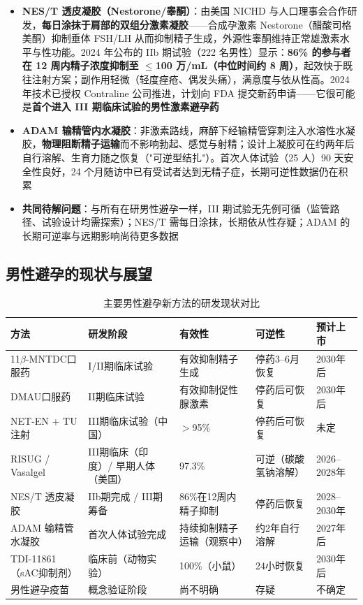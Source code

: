 \begin{itemize}[leftmargin=2cm]
	\item \textbf{NES/T 透皮凝胶（Nestorone/睾酮）}：由美国 NICHD 与人口理事会合作研发，\textbf{每日涂抹于肩部的双组分激素凝胶}——合成孕激素 Nestorone（醋酸司格美酮）抑制垂体 FSH/LH 从而抑制精子生成，外源性睾酮维持正常雄激素水平与性功能。2024 年公布的 IIb 期试验（222 名男性）显示：\textbf{86\% 的参与者在 12 周内精子浓度抑制至 $\leq$100 万/mL（中位时间约 8 周）}，起效快于既往注射方案；副作用轻微（轻度痤疮、偶发头痛），满意度与依从性高。2024 年技术已授权 Contraline 公司推进，计划向 FDA 提交新药申请——它很可能是\textbf{首个进入 III 期临床试验的男性激素避孕药}
	\item \textbf{ADAM 输精管内水凝胶}：非激素路线，麻醉下经输精管穿刺注入水溶性水凝胶，\textbf{物理阻断精子运输}而不影响勃起、感觉与射精；设计上凝胶可在约两年后自行溶解、生育力随之恢复（"可逆型结扎"）。首次人体试验（25 人）90 天安全性良好，24 个月随访中已有受试者达到无精子症，长期可逆性数据仍在积累
	\item \textbf{共同待解问题}：与所有在研男性避孕一样，III 期试验无先例可循（监管路径、试验设计均需探索）；NES/T 需每日涂抹，长期依从性存疑；ADAM 的长期可逆率与远期影响尚待更多数据
\end{itemize}

\subsection{男性避孕的现状与展望}

\begin{table}[htbp]
\centering
\caption{主要男性避孕新方法的研发现状对比}
\label{tab:male_contraception_new}
\begin{tabularx}{\textwidth}{@{}lXXXX@{}}
    \toprule
    \textbf{方法} & \textbf{研发阶段} & \textbf{有效性} & \textbf{可逆性} & \textbf{预计上市} \\
    \midrule
    11$\beta$-MNTDC口服药 & I/II期临床试验 & 有效抑制精子生成 & 停药3--6月恢复 & 2030年后 \\
    DMAU口服药 & II期临床试验 & 有效抑制促性腺激素 & 停药后可恢复 & 2030年后 \\
    NET-EN + TU注射 & III期临床试验（中国） & $>$95\% & 停药后可恢复 & 未定 \\
    RISUG / Vasalgel & III期临床（印度）/ 早期人体（美国） & 97.3\% & 可逆（碳酸氢钠溶解） & 2026--2028年 \\
    NES/T 透皮凝胶 & IIb期完成 / III期筹备 & 86\%在12周内精子抑制 & 停药后恢复 & 2028--2030年 \\
    ADAM 输精管水凝胶 & 首次人体试验完成 & 持续抑制精子运输（观察中） & 约2年自行溶解 & 2027年后 \\
    TDI-11861（sAC抑制剂） & 临床前（动物实验） & 100\%（小鼠） & 24小时恢复 & 2030年后 \\
    男性避孕疫苗 & 概念验证阶段 & 尚不明确 & 存疑 & 不确定 \\
    \bottomrule
\end{tabularx}
\end{table}


